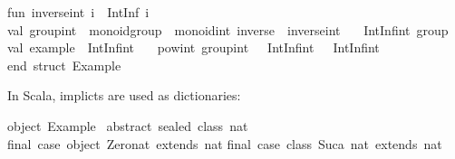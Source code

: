 \begin{isabellebody}
\begin{isamarkuptext}
\isanewline
fun\ inverse{}int\ i\ {}\ IntInf{}{}\ i{}\isanewline
\isanewline
val\ group{}int\ {}\ {}monoid{}group\ {}\ monoid{}int{}\ inverse\ {}\ inverse{}int{}\ {}\isanewline
\ \ IntInf{}int\ group{}\isanewline
\isanewline
val\ example\ {}\ IntInf{}int\ {}\isanewline
\ \ pow{}int\ group{}int\ {}{}{}\ {}\ IntInf{}int{}\ {}{}{}\ {}\ IntInf{}int{}{}\isanewline
\isanewline
end{}\ {}{}struct\ Example{}{}\isanewline%
\end{isamarkuptext}%
\isamarkuptrue%
%
\endisatagquotetypewriter
{\isafoldquotetypewriter}%
%
\isadelimquotetypewriter
%
\endisadelimquotetypewriter
%
\begin{isamarkuptext}%
\noindent In Scala, implicts are used as dictionaries:%
\end{isamarkuptext}%
\isamarkuptrue%
%
\isadeliminvisible
%
\endisadeliminvisible
%
\isataginvisible
%
\endisataginvisible
{\isafoldinvisible}%
%
\isadeliminvisible
%
\endisadeliminvisible
%
\isadelimquotetypewriter
%
\endisadelimquotetypewriter
%
\isatagquotetypewriter
%
\begin{isamarkuptext}%
object\ Example\ {}\isanewline
\isanewline
abstract\ sealed\ class\ nat\isanewline
final\ case\ object\ Zero{}nat\ extends\ nat\isanewline
final\ case\ class\ Suc{}a{}\ nat{}\ extends\ nat\isanewline

\end{isamarkuptext}
\end{isabellebody}
